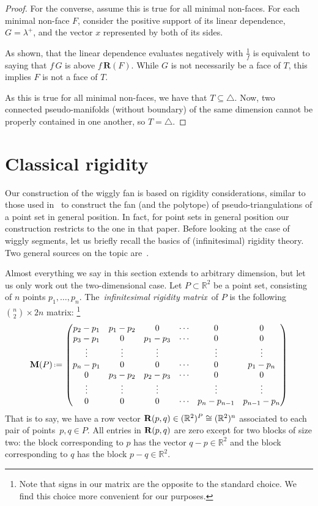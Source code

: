 \documentclass{amsart}
\theoremstyle{definition}
\newcommand{\R}{\mathbb{R}} %
\renewcommand{\b}[1]{{\boldsymbol{#1}}} %
\newcommand{\eqdef}{\mbox{\,\raisebox{0.2ex}{\scriptsize\ensuremath{\mathrm:}}\ensuremath{=}\,}} %
\newcommand{\simplex}{\b{\triangle}} %
\newcommand{\darkblue}{\color{darkblue}} %
\newcommand{\defn}[1]{\textsl{\darkblue #1}} %
\newcommand{\Rvector}{\b{\rm R}} %
\newcommand{\Mmatrix}{\b{\rm M}} %
\begin{document}
\begin{proof}
  For the converse, assume this is true for all minimal non-faces.
  For each minimal non-face $F$, consider the positive support of its linear dependence,
  $G = \lambda^+$, and the vector $x$ represented by both of its sides.

  As shown, that the linear dependence evaluates negatively with $\tfrac{1}{f}$
  is equivalent to saying that $f\, G$ is above $f\, \b{R}(F)$.
  While $G$ is not necessarily be a face of $T$, this implies $F$ is not a face of $T$.
  
  As this is true for all minimal non-faces, we have that $T \subseteq \simplex$.
  Now, two connected pseudo-manifolds (without boundary) of the same dimension
  cannot be properly contained in one another, so $T = \simplex$.
\end{proof}


\section{Classical rigidity}
\label{sec:rigidity}

Our construction of the wiggly fan is based on rigidity considerations, similar to those used in~\cite{RoteSantosStreinu-polytope} to construct the fan (and the polytope) of pseudo-triangulations of a point set in general position.
In fact, for point sets in general position our construction restricts to the one in that paper.
Before looking at the case of wiggly segments, let us briefly recall the basics of (infinitesimal) rigidity theory. Two general sources on the topic are~\cite{GraverServatiusServatius,Jordan-rigidity}. 

Almost everything we say in this section extends to arbitrary dimension, but let us only work out the two-dimensional case.
Let $P \subset \R^2$ be a point set, consisting of $n$ points $p_1,\dots,p_n$. The~\defn{infinitesimal rigidity matrix} of $P$ is the following $\binom{n}{2} \times 2n$ matrix:%
\footnote{Note that signs in our matrix are the opposite to the standard choice. We find this choice more convenient for our purposes.}
\[
\Mmatrix(P) \eqdef
\begin{pmatrix}
p_2-p_1 & p_1-p_2 & 0 & \cdots & 0 & 0 \\
p_3-p_1 & 0 & p_1-p_3 & \cdots & 0 & 0 \\
\vdots & \vdots & \vdots & & \vdots & \vdots \\
p_n-p_1 & 0 & 0 & \cdots & 0 & p_1-p_n \\
0 & p_3-p_2 & p_2-p_3 & \cdots & 0 & 0 \\
\vdots & \vdots & \vdots & & \vdots & \vdots \\
0 & 0 & 0 & \cdots & p_{n}-p_{n-1} & p_{n-1}-p_{n}
\end{pmatrix}
\]
That is to say, we have a row vector $\Rvector(p,q)\in (\R^2)^P \cong (\R^2)^n$ associated to each pair of points~${p,q\in P}$.
All entries in $\Rvector(p,q)$ are zero except for two blocks of size two: the block corresponding to $p$ has the vector $q-p \in \R^2$ and the block corresponding to $q$ has the block $p-q \in \R^2$.
\end{document}
